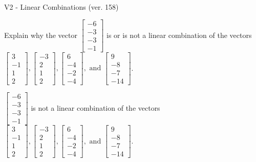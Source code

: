 \begin{exercise}
  \begin{exerciseTitle}V2 - Linear Combinations (ver. 158)\end{exerciseTitle}
  \begin{exerciseStatement}
    Explain why the vector \(\left[\begin{array}{c}
-6 \\
-3 \\
-3 \\
-1
\end{array}\right]\)  is or is not a linear 
	combination of the vectors \(\left[\begin{array}{c}
3 \\
-1 \\
1 \\
2
\end{array}\right] , \left[\begin{array}{c}
-3 \\
2 \\
1 \\
2
\end{array}\right] , \left[\begin{array}{c}
6 \\
-4 \\
-2 \\
-4
\end{array}\right] , \text{ and } \left[\begin{array}{c}
9 \\
-8 \\
-7 \\
-14
\end{array}\right]\).
	


  \end{exerciseStatement}
  \begin{exerciseAnswer}
   \(\left[\begin{array}{c}
-6 \\
-3 \\
-3 \\
-1
\end{array}\right]\) 
  	 is not  
	a linear combination of the vectors \(\left[\begin{array}{c}
3 \\
-1 \\
1 \\
2
\end{array}\right] , \left[\begin{array}{c}
-3 \\
2 \\
1 \\
2
\end{array}\right] , \left[\begin{array}{c}
6 \\
-4 \\
-2 \\
-4
\end{array}\right] , \text{ and } \left[\begin{array}{c}
9 \\
-8 \\
-7 \\
-14
\end{array}\right]\).


\end{exerciseAnswer}
\end{exercise}
